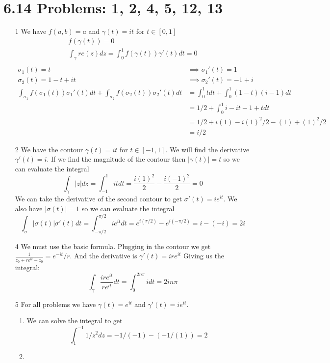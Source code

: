 \documentclass{article}
\begin{document}
  \section{6.14 Problems: 1, 2, 4, 5, 12, 13}
  \begin{enumerate}
    \item[1]
      We have $f(a,b)=a$ and $\gamma(t)=it$ for $t\in[0,1]$
      \begin{align*}
        f(\gamma(t))=0\\
        \int_\gamma re(z)dz=\int_0^1f(\gamma(t))\gamma'(t)dt=0\\
      \end{align*}
      \begin{align*}
        \sigma_1(t)=t&\implies \sigma_1'(t)=1\\
        \sigma_2(t)=1-t+it&\implies \sigma_2'(t)=-1+i\\
        \int_{\sigma_1} f(\sigma_1(t))\sigma_1'(t)dt+\int_{\sigma_2}f(\sigma_2(t))\sigma_2'(t)dt&=\int_0^1 tdt+\int_0^1(1-t)(i-1)dt\\
        &=1/2+\int_0^1i-it-1+tdt\\
        &=1/2+i(1)-i(1)^2/2-(1)+(1)^2/2\\
        &=i/2
      \end{align*}
    \item[2]
      We have the contour $\gamma(t)=it$ for $t\in[-1,1]$. We will find the derivative $\gamma'(t)=i$. If we find the magnitude of the contour then $|\gamma(t)|=t$ so we can evaluate the integral
      \[\int_{\gamma}|z|dz=\int_{-1}^1itdt=\frac{i(1)^2}{2}-\frac{i(-1)^2}{2}=0\]
      We can take the derivative of the second contour to get $\sigma'(t)=ie^{it}$. We also have $|\sigma(t)|=1$ so we can evaluate the integral
      \[\int_{\sigma}|\sigma(t)|\sigma'(t)dt=\int_{-\pi/2}^{\pi/2}ie^{it}dt=e^{i(\pi/2)}-e^{i(-\pi/2)}=i-(-i)=2i\]
    \item[4]
      We must use the basic formula. Plugging in the contour we get $\frac{1}{z_0+re^{it}-z_0}=e^{-it}/r$. And the derivative is $\gamma'(t)=ire^{it}$ Giving us the integral:
      \[\int_\gamma \frac{ire^{it}}{re^{it}}dt=\int_{0}^{2n\pi}idt=2in\pi\]
    \item[5]
      For all problems we have $\gamma(t)=e^{it}$ and $\gamma'(t)=ie^{it}$.
      \begin{enumerate}[label=(\roman*)]
        \item
          We can solve the integral to get
          \[\int_{1}^{-1} 1/z^2dz=-1/(-1)-(-1/(1))=2\]
        \item

\end{enumerate}
\end{enumerate}
\end{document}
